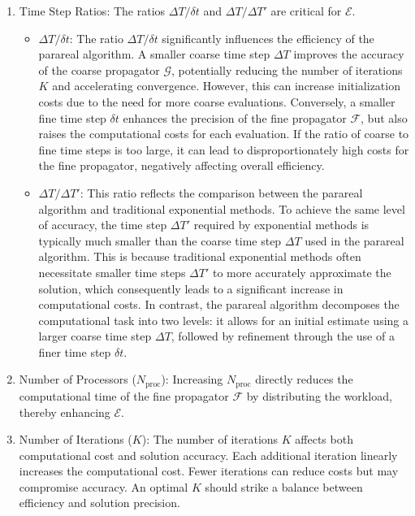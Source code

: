 \documentclass[preprint,12pt]{elsarticle}
\begin{document}
	\begin{enumerate}
		\item Time Step Ratios:  
		The ratios  $\Delta T / \delta t$  and $\Delta T / \Delta T'$ are critical for $\mathcal{E}$.
		\begin{itemize}
			\item $\Delta T / \delta t$: The ratio $\Delta T / \delta t$ significantly influences the efficiency of the parareal algorithm. A smaller coarse time step $ \Delta T$ improves the accuracy of the coarse propagator $\mathcal{G}$, potentially reducing the number of iterations $K$ and accelerating convergence. However, this can increase initialization costs due to the need for more coarse evaluations. Conversely, a smaller fine time step $\delta t$ enhances the precision of the fine propagator $\mathcal{F}$, but also raises the computational costs for each evaluation. If the ratio of coarse to fine time steps is too large, it can lead to disproportionately high costs for the fine propagator, negatively affecting overall efficiency.
			\item $\Delta T / \Delta T'$: This ratio reflects the comparison between the parareal algorithm and traditional exponential methods. To achieve the same level of accuracy, the time step $\Delta T'$ required by exponential methods is typically much smaller than the coarse time step $\Delta T$ used in the parareal algorithm. This is because traditional exponential methods often necessitate smaller time steps $\Delta T'$ to more accurately approximate the solution, which consequently leads to a significant increase in computational costs. In contrast, the parareal algorithm decomposes the computational task into two levels: it allows for an initial estimate using a larger coarse time step $\Delta T$, followed by refinement through the use of a finer time step $\delta t$.
		\end{itemize}
		
		\item Number of Processors ($N_{\text{proc}}$):  
		Increasing $N_{\text{proc}}$ directly reduces the computational time of the fine propagator $\mathcal{F}$ by distributing the workload, thereby enhancing $\mathcal{E}$.
		\item Number of Iterations ($ K $): The number of iterations $ K $ affects both computational cost and solution accuracy. Each additional iteration linearly increases the computational cost. Fewer iterations can reduce costs but may compromise accuracy. An optimal $ K $ should strike a balance between efficiency and solution precision.
	\end{enumerate}
	
\end{document}
